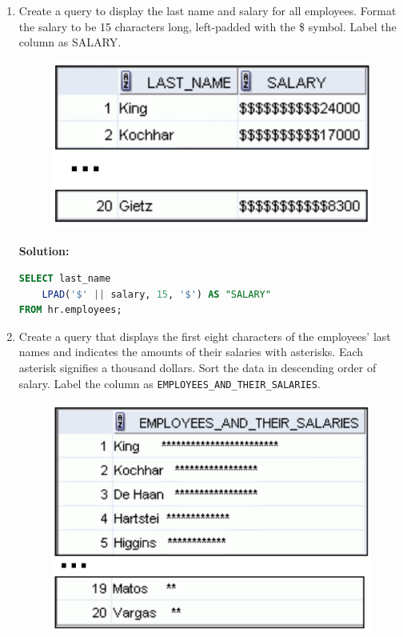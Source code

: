 \documentclass[a4paper,12pt]{article}
\begin{document}
\begin{enumerate}
            \item Create a query to display the last name and salary for all employees. Format the salary to be 15
characters long, left-padded with the \$ symbol. Label the column as SALARY.
    \begin{figure}[h]
        \centering
        \includegraphics*[width=.5\linewidth]{graphics/37.png}
    \end{figure}

\textbf{Solution: }
        \begin{lstlisting}[language=SQL, label={lst:employees_data}]
SELECT last_name 
    LPAD('$' || salary, 15, '$') AS "SALARY"
FROM hr.employees;

    \end{lstlisting}
        \item Create a query that displays the first eight characters of the employees' last names and indicates
the amounts of their salaries with asterisks. Each asterisk signifies a thousand dollars. Sort the
data in descending order of salary. Label the column as
\texttt{EMPLOYEES\_AND\_THEIR\_SALARIES}. 
    \begin{figure}[h]
        \centering
        \includegraphics*[width=.5\linewidth]{graphics/38.png}
    \end{figure}


\end{enumerate}
\end{document}
